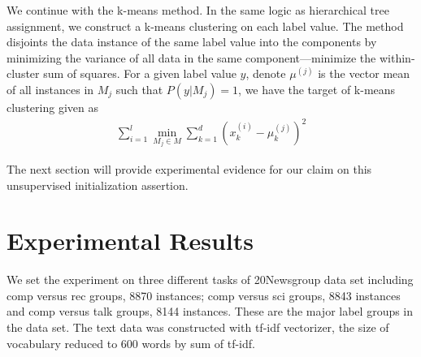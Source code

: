 We continue with the k-means method. In the same logic as hierarchical tree assignment, we construct a k-means clustering on each label value. The method disjoints the data instance of the same label value into the components by minimizing the variance of all data in the same component---minimize the within-cluster sum of squares. For a given label value $y$, denote $\mu^{(j)}$ is the vector mean of all instances in $M_j$ such that $P(y|M_j) = 1$, we have the target of k-means clustering given as
\begin{align}
	\sum_{i=1}^{l}{
		\min_{M_j \in M} {
			\sum_{k=1}^{d}{(x^{(i)}_k - \mu^{(j)}_k)^2}
		}
	}
\end{align}

The next section will provide experimental evidence for our claim on this unsupervised initialization assertion.

\section{Experimental Results}
\label{sec2: exp results}
We set the experiment on three different tasks of 20Newsgroup data set including comp versus rec groups, 8870 instances; comp versus sci groups, 8843 instances and comp versus talk groups, 8144 instances. These are the major label groups in the data set. The text data was constructed with tf-idf vectorizer, the size of vocabulary reduced to 600 words by sum of tf-idf.

